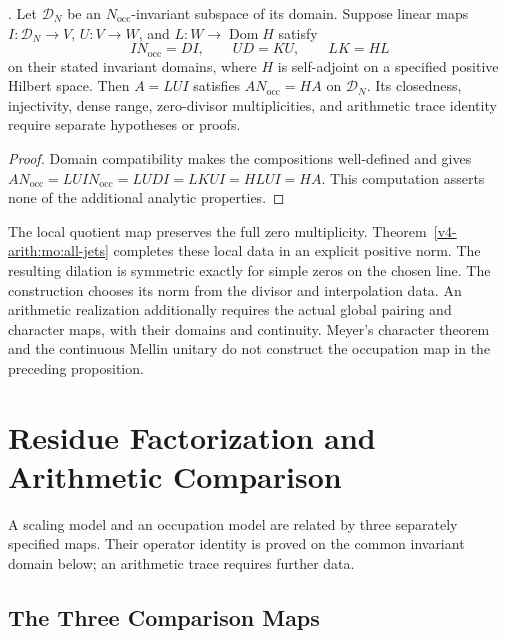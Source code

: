 \begin{proposition}
\label{v4-arith:w9-r4:thm:meyer-eq-HPAr}
\ClaimStatusProvedHereConditional. Let $\mathscr D_N$ be an
$N_{\mathrm{occ}}$-invariant subspace of its domain. Suppose linear
maps $I:\mathscr D_N\to V$, $U:V\to W$, and
$L:W\to\operatorname{Dom}H$ satisfy
\[
 IN_{\mathrm{occ}}=DI,\qquad UD=KU,\qquad LK=HL
\]
on their stated invariant domains, where $H$ is self-adjoint
on a specified positive Hilbert space. Then $A=LUI$ satisfies
$AN_{\mathrm{occ}}=HA$ on $\mathscr D_N$.
Its closedness, injectivity, dense range, zero-divisor multiplicities,
and arithmetic trace identity require separate hypotheses or proofs.
\end{proposition}
\begin{proof}
Domain compatibility makes the compositions well-defined and gives
$AN_{\mathrm{occ}}=LUIN_{\mathrm{occ}}=LUDI=LKUI=HLUI=HA$.
This computation asserts none of the additional analytic properties.
\end{proof}

\begin{remark}
\label{v4-arith:w9-r4:rem:meyer-schwartz-only}
The local quotient map preserves the full zero multiplicity.
Theorem~\ref{v4-arith:mo:all-jets} completes these local data in an
explicit positive norm. The resulting dilation is symmetric
exactly for simple zeros on the chosen line.
The construction chooses its norm from the divisor and interpolation
data. An arithmetic realization additionally requires the actual
global pairing and character maps, with their domains and continuity.
Meyer's character theorem and the continuous Mellin unitary do not
construct the occupation map in the preceding proposition.
\end{remark}



\section{Residue Factorization and Arithmetic Comparison}
\label{v4-arith:w9-r4:residual}

A scaling model and an occupation model are related by three
separately specified maps. Their operator identity is proved on the
common invariant domain below; an arithmetic trace requires further data.

\subsection{The Three Comparison Maps}
\label{v4-arith:w9-r4:residual:statement}

